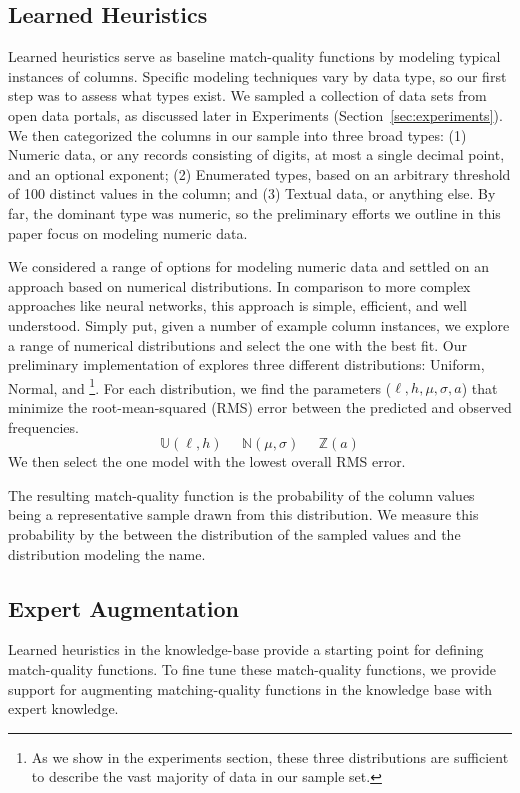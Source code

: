 \subsection{Learned Heuristics}
Learned heuristics serve as baseline match-quality functions by modeling typical instances of columns.
Specific modeling techniques vary by data type, so our first step was to assess what types exist.
We sampled a collection of \placeholder{\#\#\#} data sets from open data portals, as discussed later in Experiments (Section~\ref{sec:experiments}).
We then categorized the \placeholder{\#\#\#} columns in our sample into three broad types: 
(1) Numeric data, or any records consisting of digits, at most a single decimal point, and an optional exponent; 
(2) Enumerated types, based on an arbitrary threshold of 100 distinct values in the column; and 
(3) Textual data, or anything else.  
By far, the dominant type was numeric, so the preliminary efforts we outline in this paper focus on modeling numeric data.

We considered a range of options for modeling numeric data and settled on an approach based on numerical distributions.
In comparison to more complex approaches like neural networks, this approach is simple, efficient, and well understood.
Simply put, given a number of example column instances, we explore a range of numerical distributions and select the one with the best fit.
Our preliminary implementation of \systemname explores three different distributions: Uniform, Normal, and \footnote{As we show in the experiments section, these three distributions are sufficient to describe the vast majority of data in our sample set.}.  
For each distribution, we find the parameters ($\ell,h,\mu,\sigma,a$) that minimize the root-mean-squared (RMS) error between the predicted and observed frequencies. 
$$\mathbb U(\ell, h)\;\;\;\;\;\mathbb N(\mu, \sigma)\;\;\;\;\;\mathbb Z(a)$$
We then select the one model with the lowest overall RMS error.

The resulting match-quality function is the probability of the column values being a representative sample drawn from this distribution.
We measure this probability by the  between the distribution of the sampled values and the distribution modeling the name.

\subsection{Expert Augmentation}
Learned heuristics in the \systemname knowledge-base provide a starting point for defining match-quality functions.
To fine tune these match-quality functions, we provide support for augmenting matching-quality functions in the knowledge base with expert knowledge.

